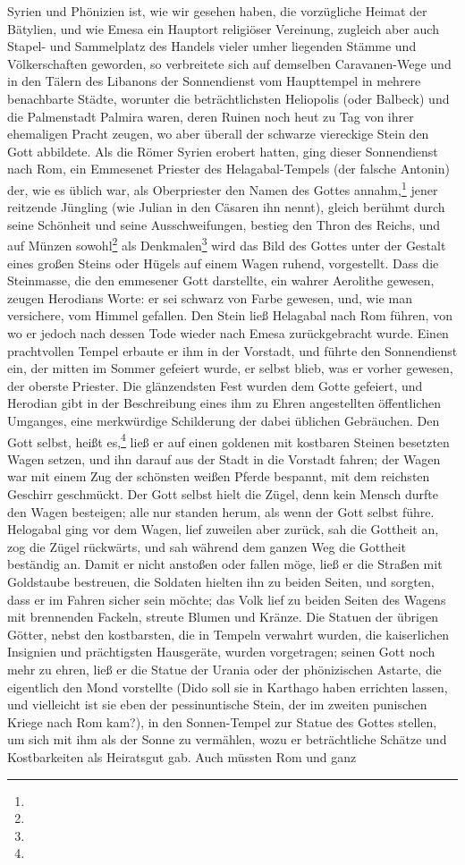 \documentclass[a4paper, 11pt, oneside, polutonikogreek, german]{article}
\begin{document}
Syrien und Phönizien ist, wie wir gesehen haben, die vorzügliche Heimat der Bätylien, und wie Emesa ein Hauptort religiöser Vereinung, zugleich aber auch Stapel- und Sammelplatz des Handels vieler umher liegenden Stämme und Völkerschaften geworden, so verbreitete sich auf demselben Caravanen-Wege und in den Tälern des Libanons der Sonnendienst vom Haupttempel in mehrere benachbarte Städte, worunter die beträchtlichsten Heliopolis (oder Balbeck) und die Palmenstadt Palmira waren, deren Ruinen noch heut zu Tag von ihrer ehemaligen Pracht zeugen, wo aber überall der schwarze viereckige Stein den Gott abbildete. Als die Römer Syrien erobert hatten, ging dieser Sonnendienst nach Rom, ein Emmesenet Priester des Helagabal-Tempels (der falsche Antonin) der, wie es üblich war, als Oberpriester den Namen des Gottes annahm,\footnote{} jener reitzende Jüngling (wie Julian in den Cäsaren ihn nennt), gleich berühmt durch seine Schönheit und seine Ausschweifungen, bestieg den Thron des Reichs, und auf Münzen sowohl\footnote{} als Denkmalen\footnote{} wird das Bild des Gottes unter der Gestalt eines großen Steins oder Hügels auf einem Wagen ruhend, vorgestellt. Dass die Steinmasse, die den emmesener Gott darstellte, ein wahrer Aerolithe gewesen, zeugen Herodians Worte: er sei schwarz von Farbe gewesen, und, wie man versichere, vom Himmel gefallen. Den Stein ließ Helagabal nach Rom führen, von wo er jedoch nach dessen Tode wieder nach Emesa zurückgebracht wurde. Einen prachtvollen Tempel erbaute er ihm in der Vorstadt, und führte den Sonnendienst ein, der mitten im Sommer gefeiert wurde, er selbst blieb, was er vorher gewesen, der oberste Priester. Die glänzendsten Fest wurden dem Gotte gefeiert, und Herodian gibt in der Beschreibung eines ihm zu Ehren angestellten öffentlichen Umganges, eine merkwürdige Schilderung der dabei üblichen Gebräuchen. Den Gott selbst, heißt es,\footnote{} ließ er auf einen goldenen mit kostbaren Steinen besetzten Wagen setzen, und ihn darauf aus der Stadt in die Vorstadt fahren; der Wagen war mit einem Zug der schönsten weißen Pferde bespannt, mit dem reichsten Geschirr geschmückt. Der Gott selbst hielt die Zügel, denn kein Mensch durfte den Wagen besteigen; alle nur standen herum, als wenn der Gott selbst führe. Helogabal ging vor dem Wagen, lief zuweilen aber zurück, sah die Gottheit an, zog die Zügel rückwärts, und sah während dem ganzen Weg die Gottheit beständig an. Damit er nicht anstoßen oder fallen möge, ließ er die Straßen mit Goldstaube bestreuen, die Soldaten hielten ihn zu beiden Seiten, und sorgten, dass er im Fahren sicher sein möchte; das Volk lief zu beiden Seiten des Wagens mit brennenden Fackeln, streute Blumen und Kränze. Die Statuen der übrigen Götter, nebst den kostbarsten, die in Tempeln verwahrt wurden, die kaiserlichen Insignien und prächtigsten Hausgeräte, wurden vorgetragen; seinen Gott noch mehr zu ehren, ließ er die Statue der Urania oder der phönizischen Astarte, die eigentlich den Mond vorstellte (Dido soll sie in Karthago haben errichten lassen, und vielleicht ist sie eben der pessinuntische Stein, der im zweiten punischen Kriege nach Rom kam?), in den Sonnen-Tempel zur Statue des Gottes stellen, um sich mit ihm als der Sonne zu vermählen, wozu er beträchtliche Schätze und Kostbarkeiten als Heiratsgut gab. Auch müssten Rom und ganz 
\end{document}
